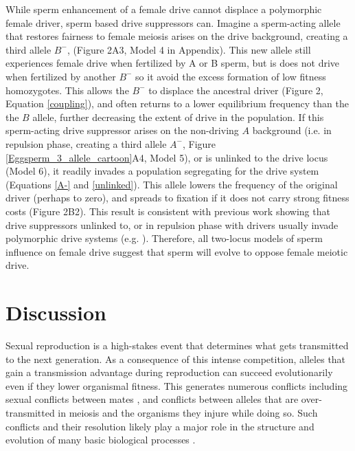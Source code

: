 \documentclass{pnastwo}
\begin{document}
\begin{article}
While  sperm enhancement of a female drive cannot displace a polymorphic female driver, sperm based drive suppressors can. 
Imagine a sperm-acting allele that restores fairness to female meiosis arises on
	the drive background, creating a
        third allele $B^{-}$, (Figure 2A3, Model 4 in Appendix). 
 This new allele still
        experiences female drive when fertilized by A or B sperm, but 
       is does not drive when fertilized by another $B^{-}$ so it
       avoid the excess formation of low fitness homozygotes. This
     allows the $B^{-}$ to displace the ancestral driver (Figure
     2, Equation \ref{coupling}), 
	and often returns to a lower equilibrium frequency than the the $B$ allele, further decreasing the extent of drive in the population.  
If this sperm-acting drive suppressor arises on 
	the non-driving $A$ background (i.e. in repulsion phase, 
	creating a third allele $A^{-}$, Figure \ref{Eggsperm_3_allele_cartoon}A4, Model 5), 
	or is unlinked to the drive locus (Model 6), it readily invades a population segregating
	for the drive system (Equations \ref{A-} and \ref{unlinked}).  
This allele lowers the frequency of the original driver (perhaps to zero),
	and spreads to fixation if it does not carry strong fitness costs
	(Figure 2B2). 
This result is consistent with previous work showing that drive suppressors unlinked to, or in repulsion phase with drivers usually invade polymorphic drive systems (e.g. \cite{Brandvain2012}).  
Therefore, all two-locus models of sperm influence on female drive suggest that
	sperm will evolve to oppose female meiotic drive.	
	


\section*{Discussion}

Sexual reproduction is a high-stakes event that determines what gets transmitted to the next generation.  
As a consequence of this intense competition, alleles that gain a transmission advantage during reproduction 
	can succeed evolutionarily even if they lower organismal fitness. 
This generates numerous conflicts  \cite{Burt2006} including sexual conflicts between mates \cite{Arnqvist2005}, 
	and conflicts between alleles that are over-transmitted in meiosis and the organisms they injure while doing so. 
Such conflicts and their resolution likely play a major role in the structure and evolution of many basic biological processes \cite{Rice2013}.


\end{article}
\end{document}
